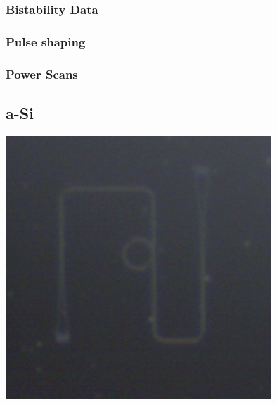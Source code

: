\subsubsection{Bistability Data}
\subsubsection{Pulse shaping}
\subsubsection{Power Scans}
%
\subsection{a-Si}
\begingroup
    \centering  
    \includegraphics[width=10cm]{img/results/chipPictures/exampleASIRing.png}
     \vspace{3pt} \label{crossCompare}
\endgroup
